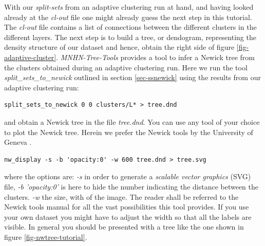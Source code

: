 With our \emph{split-sets} from an adaptive clustering run at hand,
and having looked already at the \emph{cl-out} file one might already
guess the next step in this tutorial. The \emph{cl-out} file contains
a list of connections between the different clusters in the different
layers. The next step is to build a tree, or dendogram,
representing the density structure of our dataset and hence, obtain the
right side of figure
\ref{fig-adaptive-cluster}. \emph{MNHN-Tree-Tools} provides
a tool to infer a Newick tree \cite{newick} from the clusters
obtained during an adaptive clustering run. Here we run the tool
\emph{split\_sets\_to\_newick} outlined in section \ref{sec-ssnewick}
using the results from our adaptive clustering run:
\begin{lstlisting}
split_sets_to_newick 0 0 clusters/L* > tree.dnd
\end{lstlisting}
and obtain a Newick tree in the file \emph{tree.dnd}. You can use any
tool of your choice to plot the Newick tree. Herein we prefer the
Newick tools by the University of Geneva
\cite{newick_tools}.
\begin{lstlisting}
nw_display -s -b 'opacity:0' -w 600 tree.dnd > tree.svg
\end{lstlisting}
where the options are: \emph{-s} in order to generate a \emph{scalable
vector graphics} (SVG) file, \emph{-b 'opacity:0'} is here to hide the
number indicating the distance between the clusters. \emph{-w} the
size, with of the image. The reader shall be referred to the Newick
tools manual for all the vast possibilities this tool provides. If you use
your own dataset you might have to adjust the width so that all the
labels are visible. In general you should be presented with a tree
like the one shown in figure \ref{fig-nwtree-tutorial}.
